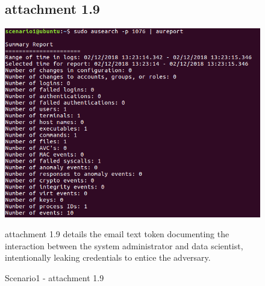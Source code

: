 \documentclass[grad,lot,lof,11pt,oneside,onehalfspace]{RUthesis}
\begin{document}
\begin{figure}[!hbt]
	\subsection{attachment 1.9}
	\centering
	\includegraphics[width=1.1\linewidth]{"Images/Chapter 7/s9"}
	\caption{Scenario1 - attachment 1.9}
	\label{fig:s9}
	attachment 1.9 details the email text token documenting the interaction between the system administrator and data scientist, intentionally leaking credentials to entice the adversary.  
\end{figure}
\cleardoublepage

\end{document}
